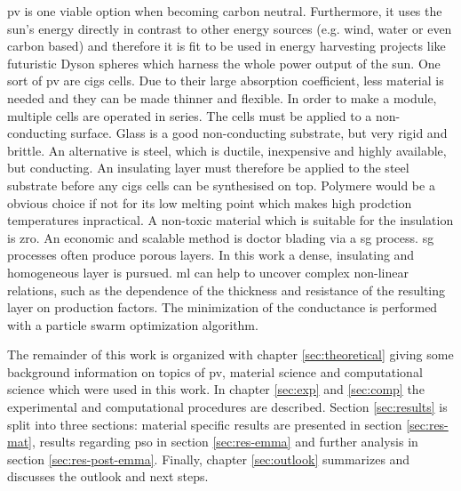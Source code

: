 \Gls{pv} is one viable option when becoming carbon neutral. 
Furthermore, 
it uses the sun's energy directly in contrast to other energy sources (e.g. wind, water or even carbon based) and therefore 
it is fit to be used in energy harvesting projects like futuristic Dyson spheres\cite{dyson1960search} which harness the whole power output of the sun.
%
One sort of \gls{pv} are \gls{cigs}\cite{Vasekar2010} cells. 
Due to their large absorption coefficient, less material is needed and they can be made thinner and flexible. 
In order to make a module, multiple cells are operated in series. 
The cells must be applied to a non-conducting surface.
Glass is a good non-conducting substrate, but very rigid and brittle. 
An alternative is steel, which is ductile, inexpensive and highly available, but conducting. 
An insulating layer must therefore be applied to the steel substrate before any \gls{cigs} cells can be synthesised on top.
Polymere would be a obvious choice if not for its low melting point which makes high prodction temperatures inpractical.
A non-toxic material which is suitable for the insulation is \gls{zro}. 
An economic and scalable method is doctor blading via a \gls{sg} process. 
\gls{sg} processes often produce porous layers. 
In this work a dense, insulating and homogeneous layer is pursued. 
\Gls{ml} can help to uncover complex non-linear relations, such as the 
dependence of the thickness and resistance of the resulting layer on production factors.
The minimization of the conductance is performed with a particle swarm optimization 
algorithm. 


The remainder of this work is organized with chapter 
\ref{sec:theoretical} giving 
some background information on topics of \gls{pv}, material science and computational science which were used in this work.
In chapter \ref{sec:exp} and \ref{sec:comp} the experimental and computational procedures are described. 
Section \ref{sec:results} is split into three sections: material specific results are presented in section \ref{sec:res-mat}, results regarding \gls{pso} in section \ref{sec:res-emma} and further analysis in section \ref{sec:res-post-emma}.
Finally, chapter \ref{sec:outlook} summarizes and discusses the outlook and next steps.

